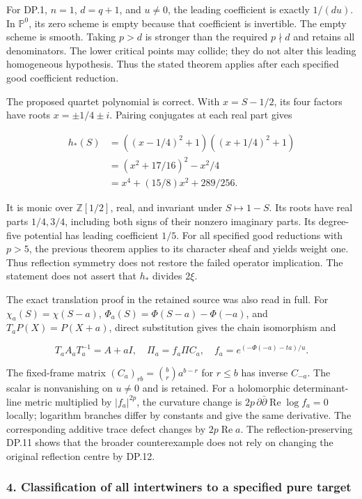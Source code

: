 For DP.1, \(n=1\), \(d=q+1\), and \(u\ne0\), the leading coefficient is exactly \(1/(du)\). In \(\mathbb P^0\), its zero scheme is empty because that coefficient is invertible. The empty scheme is smooth. Taking \(p>d\) is stronger than the required \(p\nmid d\) and retains all denominators. The lower critical points may collide; they do not alter this leading homogeneous hypothesis. Thus the stated theorem applies after each specified good coefficient reduction.

The proposed quartet polynomial is correct. With \(x=S-1/2\), its four factors have roots \(x=\pm1/4\pm i\). Pairing conjugates at each real part gives

\[
\begin{aligned}
h_*(S)
&=((x-1/4)^2+1)((x+1/4)^2+1)\\
&=(x^2+17/16)^2-x^2/4\\
&=x^4+(15/8)x^2+289/256.
\end{aligned}
\tag{DP.11}
\]

It is monic over \(\mathbb Z[1/2]\), real, and invariant under \(S\mapsto1-S\). Its roots have real parts \(1/4,3/4\), including both signs of their nonzero imaginary parts. Its degree-five potential has leading coefficient \(1/5\). For all specified good reductions with \(p>5\), the previous theorem applies to its character sheaf and yields weight one. Thus reflection symmetry does not restore the failed operator implication. The statement does not assert that \(h_*\) divides \(2\xi\).

The exact translation proof in the retained source was also read in full. For \(\chi_a(S)=\chi(S-a)\), \(\Phi_a(S)=\Phi(S-a)-\Phi(-a)\), and \(T_aP(X)=P(X+a)\), direct substitution gives the chain isomorphism and

\[
T_aA_aT_a^{-1}=A+aI,
\quad \Pi_a=f_a\Pi C_a,
\quad f_a=e^{(-\Phi(-a)-ta)/u}.
\tag{DP.12}
\]

The fixed-frame matrix \((C_a)_{rb}=\binom br a^{b-r}\) for \(r\le b\) has inverse \(C_{-a}\). The scalar is nonvanishing on \(u\ne0\) and is retained. For a holomorphic determinant-line metric multiplied by \(|f_a|^{2p}\), the curvature change is \(2p\,\partial\bar\partial\operatorname{Re}\log f_a=0\) locally; logarithm branches differ by constants and give the same derivative. The corresponding additive trace defect changes by \(2p\operatorname{Re}a\). The reflection-preserving DP.11 shows that the broader counterexample does not rely on changing the original reflection centre by DP.12.

\subsubsection{4. Classification of all intertwiners to a specified pure target}\label{endpoint-purity_review--classification-of-all-intertwiners-to-a-specified-pure-target}

